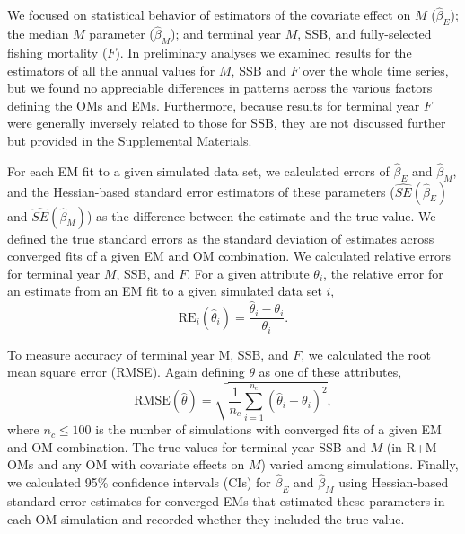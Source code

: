 \documentclass[
  12pt,
]{article}
\begin{document}
We focused on statistical behavior of estimators of the covariate effect
on \(M\) (\(\widehat \beta_E\)); the median \(M\) parameter
(\(\widehat \beta_M\)); and terminal year \(M\), SSB, and fully-selected
fishing mortality (\(F\)). In preliminary analyses we examined results
for the estimators of all the annual values for \(M\), SSB and \(F\)
over the whole time series, but we found no appreciable differences in
patterns across the various factors defining the OMs and EMs.
Furthermore, because results for terminal year \(F\) were generally
inversely related to those for SSB, they are not discussed further but
provided in the Supplemental Materials.

For each EM fit to a given simulated data set, we calculated errors of
\(\widehat \beta_E\) and \(\widehat \beta_M\), and the Hessian-based
standard error estimators of these parameters
(\(\widehat{SE}\left(\widehat \beta_E\right)\) and
\(\widehat{SE}\left(\widehat \beta_M\right)\)) as the difference between
the estimate and the true value. We defined the true standard errors as
the standard deviation of estimates across converged fits of a given EM
and OM combination. We calculated relative errors for terminal year
\(M\), SSB, and \(F\). For a given attribute \(\theta_i\), the relative
error for an estimate from an EM fit to a given simulated data set
\(i\), \begin{equation}\label{relerror}
\text{RE}_i\left(\widehat \theta_i\right) = \frac{\widehat \theta_i - \theta_i}{\theta_i}.
\end{equation}

To measure accuracy of terminal year M, SSB, and \(F\), we calculated
the root mean square error (RMSE). Again defining \(\theta\) as one of
these attributes, \[
\text{RMSE}\left(\widehat \theta\right) = \sqrt{\frac{1}{n_c}\sum^{n_c}_{i=1}\left(\widehat \theta_i - \theta_i\right)^2},
\] where \(n_c\leq 100\) is the number of simulations with converged
fits of a given EM and OM combination. The true values for terminal year
SSB and \(M\) (in R+M OMs and any OM with covariate effects on \(M\))
varied among simulations. Finally, we calculated 95\% confidence
intervals (CIs) for \(\widehat \beta_E\) and \(\widehat \beta_M\) using
Hessian-based standard error estimates for converged EMs that estimated
these parameters in each OM simulation and recorded whether they
included the true value.
\end{document}
